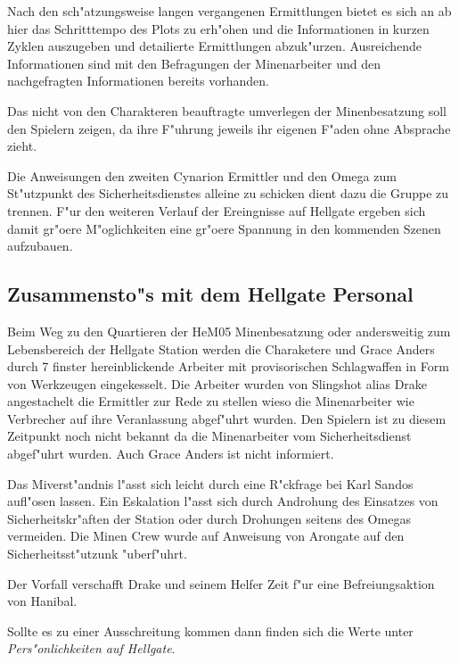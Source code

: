 \begin{remarks}
	Nach den sch"atzungsweise langen vergangenen Ermittlungen bietet es sich an ab hier das Schritttempo des Plots zu erh"ohen und die Informationen in kurzen Zyklen auszugeben und detailierte Ermittlungen abzuk"urzen. Ausreichende Informationen sind mit den Befragungen der Minenarbeiter und den nachgefragten Informationen bereits vorhanden.

	Das nicht von den Charakteren beauftragte umverlegen der Minenbesatzung soll den Spielern zeigen, da\3 ihre F"uhrung jeweils ihr eigenen F"aden ohne Absprache zieht.

	Die Anweisungen den zweiten Cynarion Ermittler und den Omega zum St"utzpunkt des Sicherheitsdienstes alleine zu schicken dient dazu die Gruppe zu trennen. F"ur den weiteren Verlauf der Ereingnisse auf Hellgate ergeben sich damit gr"o\3ere M"oglichkeiten eine gr"o\3ere Spannung in den kommenden Szenen aufzubauen.
\end{remarks}

\subsection{Zusammensto"s mit dem Hellgate Personal}

Beim Weg zu den Quartieren der HeM05 Minenbesatzung oder andersweitig zum Lebensbereich der Hellgate Station werden die Charaketere und Grace Anders durch 7 finster hereinblickende Arbeiter mit provisorischen Schlagwaffen in Form von Werkzeugen eingekesselt. Die Arbeiter wurden von Slingshot alias Drake angestachelt die Ermittler zur Rede zu stellen wieso die Minenarbeiter wie Verbrecher auf ihre Veranlassung abgef"uhrt wurden. Den Spielern ist zu diesem Zeitpunkt noch nicht bekannt da\3 die Minenarbeiter vom Sicherheitsdienst abgef"uhrt wurden. Auch Grace Anders ist nicht informiert.

\begin{remarks}
	Das Mi\3verst"andnis l"asst sich leicht durch eine R"ckfrage bei Karl Sandos aufl"osen lassen. Ein Eskalation l"asst sich durch Androhung des Einsatzes von Sicherheitskr"aften der Station oder durch Drohungen seitens des Omegas vermeiden. Die Minen Crew wurde auf Anweisung von Arongate auf den Sicherheitsst"utzunk "uberf"uhrt.
	
	Der Vorfall verschafft Drake und seinem Helfer Zeit f"ur eine Befreiungsaktion von Hanibal.

	Sollte es zu einer Ausschreitung kommen dann finden sich die Werte unter \emph{Pers"onlichkeiten auf Hellgate}.
\end{remarks}

